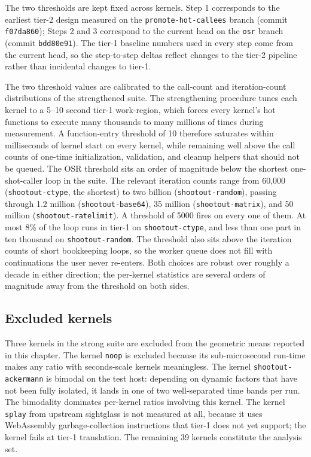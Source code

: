 The two thresholds are kept fixed across kernels. Step 1 corresponds to the earliest tier-2 design measured on the \texttt{promote-hot-callees} branch (commit \texttt{f07da860}); Steps 2 and 3 correspond to the current head on the \texttt{osr} branch (commit \texttt{bdd80e91}). The tier-1 baseline numbers used in every step come from the current head, so the step-to-step deltas reflect changes to the tier-2 pipeline rather than incidental changes to tier-1.

The two threshold values are calibrated to the call-count and iteration-count distributions of the strengthened suite. The strengthening procedure tunes each kernel to a 5--10 second tier-1 work-region, which forces every kernel's hot functions to execute many thousands to many millions of times during measurement. A function-entry threshold of 10 therefore saturates within milliseconds of kernel start on every kernel, while remaining well above the call counts of one-time initialization, validation, and cleanup helpers that should not be queued. The OSR threshold sits an order of magnitude below the shortest one-shot-caller loop in the suite. The relevant iteration counts range from 60{,}000 (\texttt{shootout-ctype}, the shortest) to two billion (\texttt{shootout-random}), passing through 1.2 million (\texttt{shootout-base64}), 35 million (\texttt{shootout-matrix}), and 50 million (\texttt{shootout-ratelimit}). A threshold of 5000 fires on every one of them. At most 8\% of the loop runs in tier-1 on \texttt{shootout-ctype}, and less than one part in ten thousand on \texttt{shootout-random}. The threshold also sits above the iteration counts of short bookkeeping loops, so the worker queue does not fill with continuations the user never re-enters. Both choices are robust over roughly a decade in either direction; the per-kernel statistics are several orders of magnitude away from the threshold on both sides.

\subsection{Excluded kernels}
\label{sec:eval:method:excluded}

Three kernels in the strong suite are excluded from the geometric means reported in this chapter. The kernel \texttt{noop} is excluded because its sub-microsecond run-time makes any ratio with seconds-scale kernels meaningless. The kernel \texttt{shootout-ackermann} is bimodal on the test host: depending on dynamic factors that have not been fully isolated, it lands in one of two well-separated time bands per run. The bimodality dominates per-kernel ratios involving this kernel. The kernel \texttt{splay} from upstream sightglass is not measured at all, because it uses WebAssembly garbage-collection instructions that tier-1 does not yet support; the kernel fails at tier-1 translation. The remaining 39 kernels constitute the analysis set.

